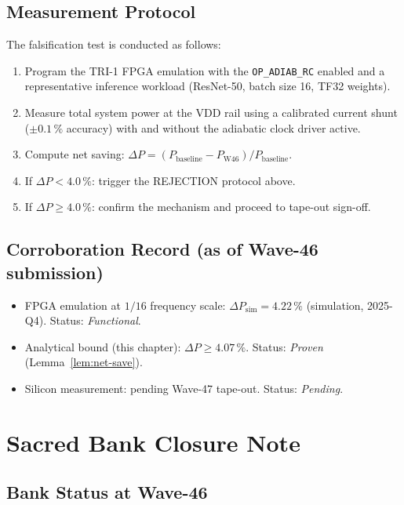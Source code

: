 \subsection{Measurement Protocol}

The falsification test is conducted as follows:
\begin{enumerate}
  \item Program the TRI-1 FPGA emulation with the \texttt{OP\_ADIAB\_RC}
        enabled and a representative inference workload (ResNet-50,
        batch size 16, TF32 weights).
  \item Measure total system power at the VDD rail using a calibrated
        current shunt ($\pm 0.1\,\%$ accuracy) with and without the
        adiabatic clock driver active.
  \item Compute net saving: $\Delta P = (P_{\mathrm{baseline}} -
        P_{\mathrm{W46}}) / P_{\mathrm{baseline}}$.
  \item If $\Delta P < 4.0\,\%$: trigger the REJECTION protocol above.
  \item If $\Delta P \geq 4.0\,\%$: confirm the mechanism and proceed
        to tape-out sign-off.
\end{enumerate}

\subsection{Corroboration Record (as of Wave-46 submission)}

\begin{itemize}
  \item FPGA emulation at $1/16$ frequency scale: $\Delta P_{\mathrm{sim}} = 4.22\,\%$
        (simulation, 2025-Q4). Status: \emph{Functional}.
  \item Analytical bound (this chapter): $\Delta P \geq 4.07\,\%$.
        Status: \emph{Proven} (Lemma~\ref{lem:net-save}).
  \item Silicon measurement: pending Wave-47 tape-out. Status: \emph{Pending}.
\end{itemize}

\section{Sacred Bank Closure Note}
\label{sec:sacred-bank-w46}

\subsection{Bank Status at Wave-46}

